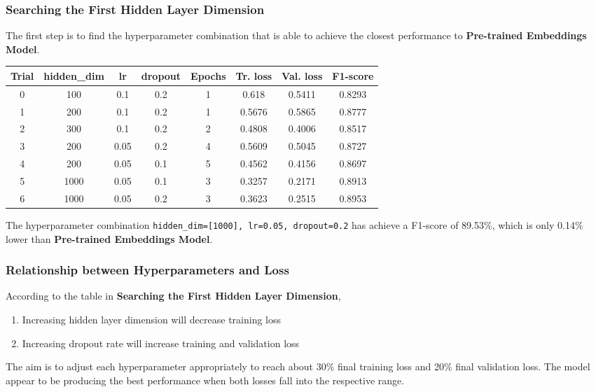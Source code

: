 \documentclass[11pt]{article}
\begin{document}
\hypertarget{searching-the-first-hidden-layer-dimension}{%
\subsubsection{Searching the First Hidden Layer
Dimension}\label{searching-the-first-hidden-layer-dimension}}

The first step is to find the hyperparameter combination that is able to
achieve the closest performance to \textbf{Pre-trained Embeddings
Model}.

\begin{longtable}[]{@{}cccccccc@{}}
\toprule
Trial & hidden\_dim & lr & dropout & Epochs & Tr. loss & Val. loss &
F1-score\tabularnewline
\midrule
\endhead
0 & 100 & 0.1 & 0.2 & 1 & 0.618 & 0.5411 & 0.8293\tabularnewline
1 & 200 & 0.1 & 0.2 & 1 & 0.5676 & 0.5865 & 0.8777\tabularnewline
2 & 300 & 0.1 & 0.2 & 2 & 0.4808 & 0.4006 & 0.8517\tabularnewline
3 & 200 & 0.05 & 0.2 & 4 & 0.5609 & 0.5045 & 0.8727\tabularnewline
4 & 200 & 0.05 & 0.1 & 5 & 0.4562 & 0.4156 & 0.8697\tabularnewline
5 & 1000 & 0.05 & 0.1 & 3 & 0.3257 & 0.2171 & 0.8913\tabularnewline
6 & 1000 & 0.05 & 0.2 & 3 & 0.3623 & 0.2515 & 0.8953\tabularnewline
\bottomrule
\end{longtable}

The hyperparameter combination
\texttt{hidden\_dim={[}1000{]},\ lr=0.05,\ dropout=0.2} has achieve a
F1-score of 89.53\%, which is only 0.14\% lower than \textbf{Pre-trained
Embeddings Model}.

\hypertarget{relationship-between-hyperparameters-and-loss}{%
\subsubsection{Relationship between Hyperparameters and
Loss}\label{relationship-between-hyperparameters-and-loss}}

According to the table in \textbf{Searching the First Hidden Layer
Dimension},

\begin{enumerate}
\def\labelenumi{\arabic{enumi}.}
\item
  Increasing hidden layer dimension will decrease training loss
\item
  Increasing dropout rate will increase training and validation loss
\end{enumerate}

The aim is to adjust each hyperparameter appropriately to reach about
30\% final training loss and 20\% final validation loss. The model
appear to be producing the best performance when both losses fall into
the respective range.
\end{document}
